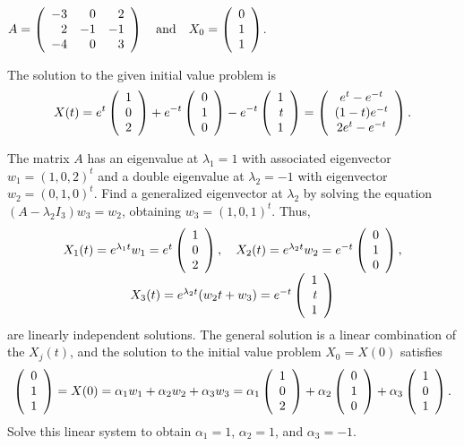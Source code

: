 \documentclass{ximera}
\begin{document}
\begin{exercise}  \label{c12.1.10b}
$A=\left(\begin{array}{rrr}
    -3   &  0   &  2\\
     2   & -1   & -1\\
    -4   &  0   &  3
\end{array}\right) \quad\mbox{and}\quad 
X_0=\left(\begin{array}{r} 0 \\ 1 \\ 1  \end{array}\right)$.

\begin{solution}
\ans The solution to the given initial value problem is
\[
X(t) = e^t\left(\begin{array}{r} 1 \\ 0 \\ 2\end{array}\right) + e^{-t}\left(\begin{array}{r} 0 \\ 1 \\ 0\end{array}\right) -
e^{-t}\left(\begin{array}{r} 1 \\ t \\ 1\end{array}\right) =
\left(\begin{array}{c} e^t - e^{-t} \\ (1 - t)e^{-t} \\ 2e^t - e^{-t}\end{array}\right).
\]

\soln The matrix $A$ has an eigenvalue at $\lambda_1 = 1$ with associated
eigenvector $w_1 = (1,0,2)^t$ and a double eigenvalue at $\lambda_2 = -1$
with eigenvector $w_2 = (0,1,0)^t$.  Find a generalized eigenvector at
$\lambda_2$ by solving the equation $(A - \lambda_2I_3)w_3 = w_2$, obtaining
$w_3 = (1,0,1)^t$.  Thus,
\[
\begin{array}{c}
X_1(t) = e^{\lambda_1 t}w_1 = e^{t}\left(\begin{array}{r} 1 \\ 0 \\ 2\end{array}\right), \quad
X_2(t) = e^{\lambda_2 t}w_2 = e^{-t}\left(\begin{array}{r} 0 \\ 1 \\ 0\end{array}\right), \\
X_3(t) = e^{\lambda_2 t}(w_2t + w_3) = e^{-t}\left(\begin{array}{r} 1 \\ t \\ 1\end{array}\right)
\end{array}
\]
are linearly independent solutions.  The general solution is a linear
combination of the $X_j(t)$, and the solution to the initial value
problem $X_0 = X(0)$ satisfies
\[
\left(\begin{array}{r} 0 \\ 1 \\ 1\end{array}\right) = X(0) = \alpha_1w_1 + \alpha_2w_2 + \alpha_3w_3
= \alpha_1\left(\begin{array}{r} 1 \\ 0 \\ 2\end{array}\right) + \alpha_2\left(\begin{array}{r} 0 \\ 1 \\ 0\end{array}\right)
+ \alpha_3\left(\begin{array}{r} 1 \\ 0 \\ 1\end{array}\right).
\]
Solve this linear system to obtain $\alpha_1 = 1$,
$\alpha_2 = 1$, and $\alpha_3 = -1$.

\end{solution}
\end{exercise}
\end{document}
